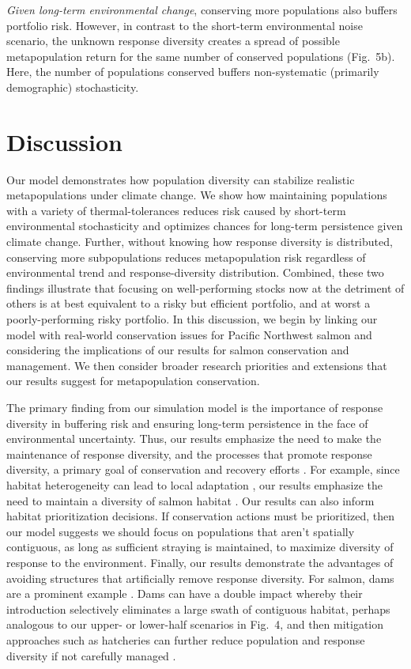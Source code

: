 \emph{Given long-term environmental change}, conserving more populations also buffers portfolio risk. However, in contrast to the short-term environmental noise scenario, the unknown response diversity creates a spread of possible metapopulation return for the same number of conserved populations (Fig.~5b). Here, the number of populations conserved buffers non-systematic (primarily demographic) stochasticity.

\section{Discussion}

Our model demonstrates how population diversity can stabilize realistic metapopulations under climate change. We show how maintaining populations with a variety of thermal-tolerances reduces risk caused by short-term environmental stochasticity and optimizes chances for long-term persistence given climate change. Further, without knowing how response diversity is distributed, conserving more subpopulations reduces metapopulation risk regardless of environmental trend and response-diversity distribution. Combined, these two findings illustrate that focusing on well-performing stocks now at the detriment of others is at best equivalent to a risky but efficient portfolio, and at worst a poorly-performing risky portfolio. In this discussion, we begin by linking our model with real-world conservation issues for Pacific Northwest salmon and considering the implications of our results for salmon conservation and management. We then consider broader research priorities and extensions that our results suggest for metapopulation conservation.

The primary finding from our simulation model is the importance of response diversity in buffering risk and ensuring long-term persistence in the face of environmental uncertainty. Thus, our results emphasize the need to make the maintenance of response diversity, and the processes that promote response diversity, a primary goal of conservation and recovery efforts \citep{moore2010}. For example, since habitat heterogeneity can lead to local adaptation \citep{taylor1991, fraser2011}, our results emphasize the need to maintain a diversity of salmon habitat \citep{rogers2008}. Our results can also inform habitat prioritization decisions. If conservation actions must be prioritized, then our model suggests we should focus on populations that aren't spatially contiguous, as long as sufficient straying is maintained, to maximize diversity of response to the environment. Finally, our results demonstrate the advantages of avoiding structures that artificially remove response diversity. For salmon, dams are a prominent example \citep{waples2007, pess2012}. Dams can have a double impact whereby their introduction selectively eliminates a large swath of contiguous habitat, perhaps analogous to our upper- or lower-half scenarios in Fig.~4, and then mitigation approaches such as hatcheries can further reduce population and response diversity if not carefully managed \citep{waples1991a, mobrand2005}.

